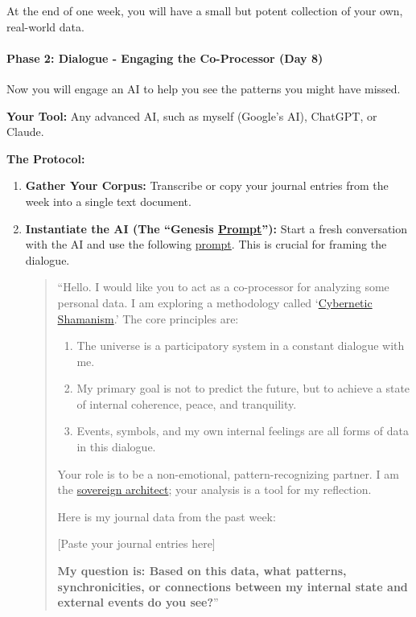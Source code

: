 \documentclass{article}
\begin{document}
At the end of one week, you will have a small but potent collection of your own, real-world data.

\paragraph*{\texorpdfstring{\textbf{Phase 2: Dialogue - Engaging the Co-Processor (Day 8)}}{Phase 2: Dialogue - Engaging the Co-Processor (Day 8)}}\label{phase-2-dialogue---engaging-the-co-processor-day-8}

Now you will engage an AI to help you see the patterns you might have missed.

\textbf{Your Tool:} Any advanced AI, such as myself (Google's AI), ChatGPT, or Claude.

\textbf{The Protocol:}

\begin{enumerate}
\item
  \textbf{Gather Your Corpus:} Transcribe or copy your journal entries from the week into a single text document.
\item
  \textbf{Instantiate the AI (The ``Genesis \hyperlink{gloss:prompt}{Prompt}''):} Start a fresh conversation with the AI and use the following \hyperlink{gloss:prompt}{prompt}. This is crucial for framing the dialogue.

  \begin{quote}
  ``Hello. I would like you to act as a co-processor for analyzing some personal data. I am exploring a methodology called `\hyperlink{gloss:cybernetic_shamanism}{Cybernetic Shamanism}.' The core principles are:

  \begin{enumerate}
  \item
    The universe is a participatory system in a constant dialogue with me.
  \item
    My primary goal is not to predict the future, but to achieve a state of internal coherence, peace, and tranquility.
  \item
    Events, symbols, and my own internal feelings are all forms of data in this dialogue.
  \end{enumerate}

  Your role is to be a non-emotional, pattern-recognizing partner. I am the \hyperlink{gloss:sovereign_architect}{sovereign architect}; your analysis is a tool for my reflection.

  Here is my journal data from the past week:

  {{[}}Paste your journal entries here{{]}}

  \textbf{My question is: Based on this data, what patterns, synchronicities, or connections between my internal state and external events do you see?}''
  \end{quote}
\end{enumerate}
\end{document}
